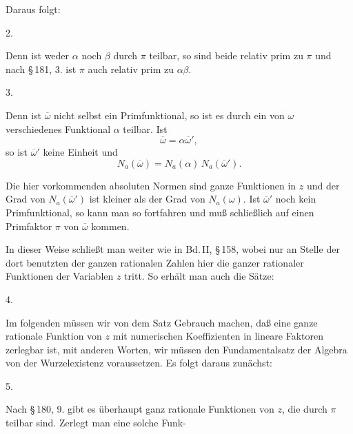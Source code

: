 Daraus folgt:

2. 

Denn ist weder $\alpha$ noch $\beta$ durch $\pi$ teilbar, so sind beide relativ prim zu $\pi$ und nach \S\,181, 3. ist $\pi$ auch relativ prim zu $\alpha\beta$.

3. 

Denn ist $\overline{\omega}$ nicht selbst ein Primfunktional, so ist es durch ein von $\omega$ verschiedenes Funktional $\alpha$ teilbar. %
Ist
\[
\overline{\omega} = \alpha \overline{\omega}',
\]
so ist $\overline{\omega}'$ keine Einheit und
\[
N_a(\overline{\omega}) = N_a(\alpha)\, N_a(\overline{\omega}').
\]

Die hier vorkommenden absoluten Normen sind ganze Funktionen in $z$ und der Grad von $N_a(\overline{\omega}')$ ist kleiner als der Grad von $N_a(\omega)$. %
Ist $\overline{\omega}'$ noch kein Primfunktional, so kann man so fortfahren und muß schließlich auf einen Primfaktor $\pi$ von $\overline{\omega}$ kommen.

In dieser Weise schließt man weiter wie in Bd.\,II, \S\,158, wobei nur an Stelle der dort benutzten  der ganzen rationalen Zahlen hier die  ganzer rationaler Funktionen der Variablen $z$ tritt. So erhält man auch die Sätze:

4. 

Im folgenden müssen wir von dem Satz Gebrauch machen, daß eine ganze rationale Funktion von $z$ mit numerischen Koeffizienten in lineare Faktoren zerlegbar ist, mit anderen Worten, wir müssen den Fundamentalsatz der Algebra von der Wurzelexistenz voraussetzen. Es folgt daraus zunächst:

5. 

Nach \S\,180, 9. gibt es überhaupt ganz %
rationale Funktionen von $z$, die durch $\pi$ teilbar sind. Zerlegt man eine solche Funk-
